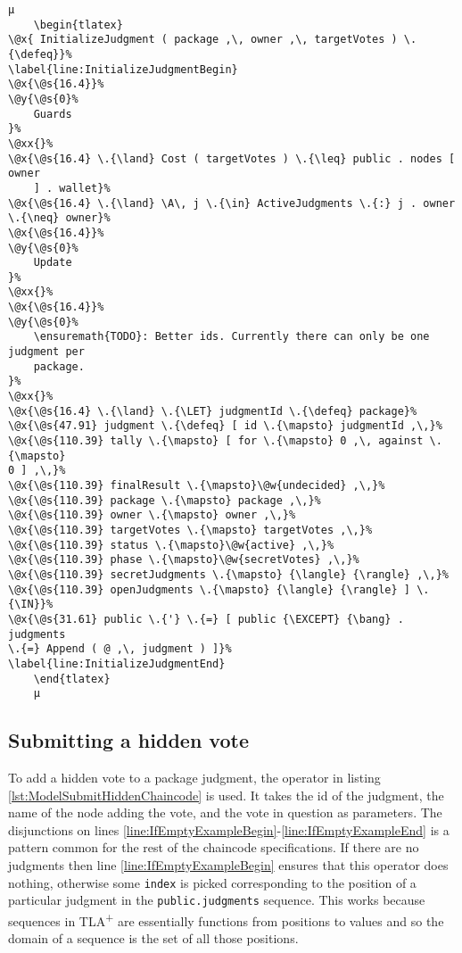 \begin{lstlisting}[caption=Chaincode for initializing a package judgment, label=lst:ModelInitializeChaincode]
	µ
	\begin{tlatex}
\@x{ InitializeJudgment ( package ,\, owner ,\, targetVotes ) \.{\defeq}}%
\label{line:InitializeJudgmentBegin}
\@x{\@s{16.4}}%
\@y{\@s{0}%
    Guards
}%
\@xx{}%
\@x{\@s{16.4} \.{\land} Cost ( targetVotes ) \.{\leq} public . nodes [ owner
    ] . wallet}%
\@x{\@s{16.4} \.{\land} \A\, j \.{\in} ActiveJudgments \.{:} j . owner
\.{\neq} owner}%
\@x{\@s{16.4}}%
\@y{\@s{0}%
    Update
}%
\@xx{}%
\@x{\@s{16.4}}%
\@y{\@s{0}%
    \ensuremath{TODO}: Better ids. Currently there can only be one judgment per
    package.
}%
\@xx{}%
\@x{\@s{16.4} \.{\land} \.{\LET} judgmentId \.{\defeq} package}%
\@x{\@s{47.91} judgment \.{\defeq} [ id \.{\mapsto} judgmentId ,\,}%
\@x{\@s{110.39} tally \.{\mapsto} [ for \.{\mapsto} 0 ,\, against \.{\mapsto}
0 ] ,\,}%
\@x{\@s{110.39} finalResult \.{\mapsto}\@w{undecided} ,\,}%
\@x{\@s{110.39} package \.{\mapsto} package ,\,}%
\@x{\@s{110.39} owner \.{\mapsto} owner ,\,}%
\@x{\@s{110.39} targetVotes \.{\mapsto} targetVotes ,\,}%
\@x{\@s{110.39} status \.{\mapsto}\@w{active} ,\,}%
\@x{\@s{110.39} phase \.{\mapsto}\@w{secretVotes} ,\,}%
\@x{\@s{110.39} secretJudgments \.{\mapsto} {\langle} {\rangle} ,\,}%
\@x{\@s{110.39} openJudgments \.{\mapsto} {\langle} {\rangle} ] \.{\IN}}%
\@x{\@s{31.61} public \.{'} \.{=} [ public {\EXCEPT} {\bang} . judgments
\.{=} Append ( @ ,\, judgment ) ]}%
\label{line:InitializeJudgmentEnd}
	\end{tlatex}
	µ
\end{lstlisting}

\subsection{Submitting a hidden vote}
\label{subsec:ModelSubmitHiddenChaincode}

To add a hidden vote to a package judgment, the operator in listing \ref{lst:ModelSubmitHiddenChaincode} is used. It takes the id of the judgment, the name of the node adding the vote, and the vote in question as parameters. The disjunctions on lines \ref{line:IfEmptyExampleBegin}-\ref{line:IfEmptyExampleEnd} is a pattern common for the rest of the chaincode specifications. If there are no judgments then line \ref{line:IfEmptyExampleBegin} ensures that this operator does nothing, otherwise some \texttt{index} is picked corresponding to the position of a particular judgment in the \texttt{public.judgments} sequence. This works because sequences in TLA\textsuperscript+ are essentially functions from positions to values and so the domain of a sequence is the set of all those positions.

